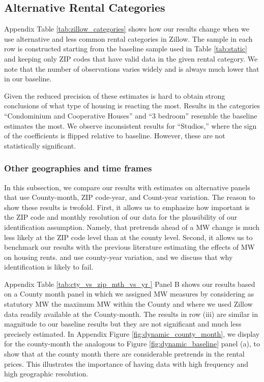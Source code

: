 \subsection{Alternative Rental Categories}

Appendix Table \ref{tab:zillow_categories} shows how our results change when we 
use alternative and less common rental categories in Zillow.
The sample in each row is constructed starting from the baseline sample used in 
Table \ref{tab:static} and keeping only ZIP codes that have valid data in the 
given rental category.
We note that the number of observations varies widely and is always much lower
that in our baseline.

Given the reduced precision of these estimates is hard to obtain strong conclusions 
of what type of housing is reacting the most.
Results in the categories ``Condominium and Cooperative Houses'' and ``3 bedroom''
resemble the baseline estimates the most.
We observe inconsistent results for ``Studios,'' where the sign of the coefficients
is flipped relative to baseline.
However, these are not statistically significant.

\subsubsection{Other geographies and time frames} \label{sec:oth_geo_time}

In this subsection, we compare our results with estimates on alternative panels
that use County-month, ZIP code-year, and Count-year variation. The reason to show 
these results is twofold. First, it allows us to emphasize how important 
is the ZIP code and monthly resolution of our data for the plausibility of our 
identification assumption. Namely, that pretrends ahead of a MW change is much 
less likely at the ZIP code level than at the county level. Second, it allows us 
to benchmark our results with the previous literature estimating the effects of 
MW on housing rents. \textcite{Yamagishi2019} and \textcite{Tidemann2018} use 
county-year variation, and we discuss that why identification is likely to fail.

Appendix Table \ref{tab:cty_vs_zip_mth_vs_yr } Panel B shows our results based on a County 
month panel in which we assigned MW measures by considering as statutory MW the maximum MW within
the County and where we used Zillow data readily available at the County-month. The results in 
row (iii) are similar in magnitude to our baseline results but they are not significant and 
much less precisely estimated. In Appendix Figure \ref{fig:dynamic_county_month}, we display 
for the county-month the analogous to Figure \ref{fig:dynamic_baseline} panel (a), to show that 
at the county month there are considerable pretrends in the rental prices. This illustrates 
the importance of having data with high frequency and high geographic resolution. 

